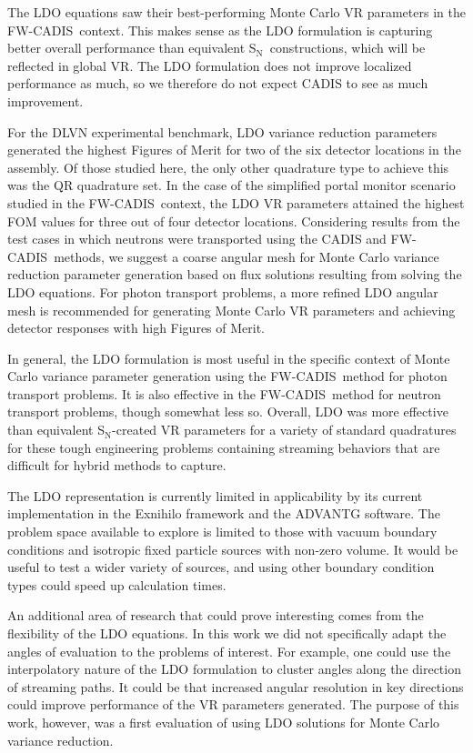 \documentclass{article} %
\newcommand{\sn}{S$_\mathrm{N}$}
\newcommand{\fwc}{\mbox{FW-CADIS}}
\begin{document}
The LDO equations saw their best-performing Monte Carlo VR parameters in the
\fwc\ context. This makes sense as the LDO formulation is capturing better
overall performance than equivalent \sn\ constructions, which will be reflected
in global VR. The LDO formulation does not improve localized performance as
much, so we therefore do not expect CADIS to see as much improvement.

For the DLVN experimental benchmark, LDO variance reduction
parameters generated the highest Figures of Merit for two of the six detector
locations in the assembly. Of those studied here, the only other quadrature
type to achieve this was the QR quadrature set. In the case of the simplified
portal monitor scenario studied in the \fwc\ context, the LDO VR
parameters attained the highest FOM values for three out of four detector
locations. Considering results from the test cases in which neutrons
were transported using the CADIS and \fwc\ methods, we suggest a coarse
angular mesh for Monte Carlo variance reduction parameter generation based on
flux solutions resulting from solving the LDO equations. For photon transport
problems, a more refined LDO angular mesh is recommended for generating Monte
Carlo VR parameters and achieving detector responses with high Figures of
Merit.

In general, the LDO formulation is most useful in the specific context of Monte
Carlo variance parameter generation using the \fwc\ method for photon transport
problems. It is also effective in the \fwc\ method for neutron transport
problems, though somewhat less so. Overall, LDO was more effective than
equivalent \sn-created VR parameters for a variety of standard quadratures for
these tough engineering problems containing streaming behaviors that are
difficult for hybrid methods to capture.

The LDO representation
is currently limited in applicability by its current implementation in the
Exnihilo framework and the ADVANTG software. The problem space available to
explore is limited to those with vacuum boundary conditions and isotropic
fixed particle sources with non-zero volume. It would be useful to test a
wider variety of sources, and using other boundary condition types could speed
up calculation times.

An additional area of research that could prove interesting comes from the
flexibility of the LDO equations. In this work we did not specifically adapt
the angles of evaluation to the problems of interest. For example, one could
use the interpolatory nature of the LDO formulation to cluster angles along
the direction of streaming paths. It could be that increased angular resolution
in key directions could improve performance of the VR parameters generated.
The purpose of this work, however, was a first evaluation of using LDO
solutions for Monte Carlo variance reduction.
\end{document}
